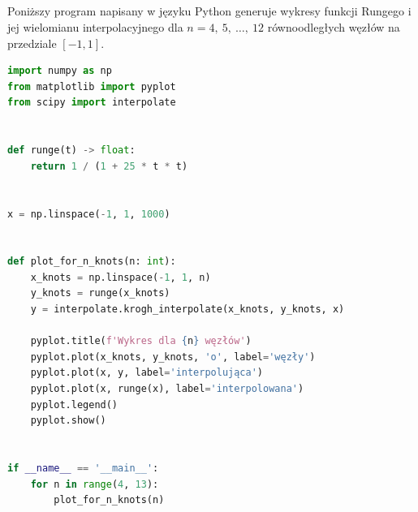 \documentclass{article}
\begin{document}
\subsection{}
Poniższy program napisany w języku Python generuje wykresy funkcji Rungego i jej wielomianu interpolacyjnego dla \(n = 4,\ 5,\ \ldots,\ 12\) równoodległych węzłów na przedziale \([-1, 1]\).
\begin{lstlisting}[language=Python]
import numpy as np
from matplotlib import pyplot
from scipy import interpolate


def runge(t) -> float:
    return 1 / (1 + 25 * t * t)


x = np.linspace(-1, 1, 1000)


def plot_for_n_knots(n: int):
    x_knots = np.linspace(-1, 1, n)
    y_knots = runge(x_knots)
    y = interpolate.krogh_interpolate(x_knots, y_knots, x)

    pyplot.title(f'Wykres dla {n} węzłów')
    pyplot.plot(x_knots, y_knots, 'o', label='węzły')
    pyplot.plot(x, y, label='interpolująca')
    pyplot.plot(x, runge(x), label='interpolowana')
    pyplot.legend()
    pyplot.show()


if __name__ == '__main__':
    for n in range(4, 13):
        plot_for_n_knots(n)
\end{lstlisting}
\end{document}
